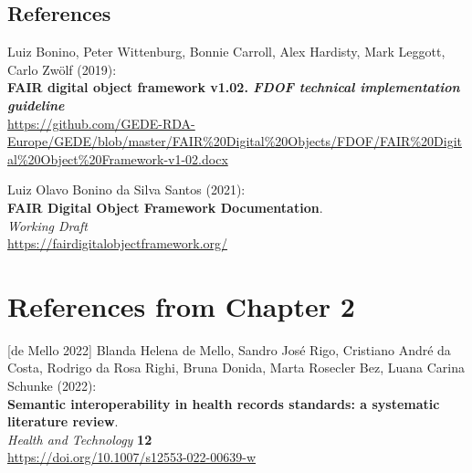 \hypertarget{references}{%
\subsection{References}\label{references}}


\begin{thebibliography}{9}
Luiz Bonino, Peter Wittenburg, Bonnie Carroll, Alex
Hardisty, Mark Leggott, Carlo Zwölf (2019):\\
\textbf{FAIR digital object framework v1.02. \emph{FDOF technical
implementation guideline}}\\
\url{https://github.com/GEDE-RDA-Europe/GEDE/blob/master/FAIR\%20Digital\%20Objects/FDOF/FAIR\%20Digital\%20Object\%20Framework-v1-02.docx}

 Luiz Olavo Bonino da Silva Santos (2021):\\
\textbf{FAIR Digital Object Framework Documentation}.\\
\emph{Working Draft}\\
\url{https://fairdigitalobjectframework.org/}


\end{thebibliography}




\section{References from Chapter 2}



{[}de Mello 2022{]} Blanda Helena de Mello, Sandro José Rigo, Cristiano
André da Costa, Rodrigo da Rosa Righi, Bruna Donida, Marta Rosecler Bez,
Luana Carina Schunke (2022):\\
\textbf{Semantic interoperability in health records standards: a
systematic literature review}.\\
\emph{Health and Technology} \textbf{12}\\
\url{https://doi.org/10.1007/s12553-022-00639-w}

